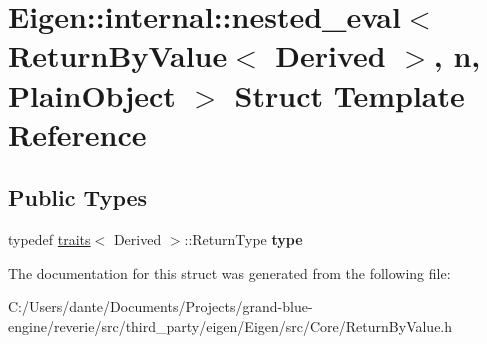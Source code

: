 \hypertarget{struct_eigen_1_1internal_1_1nested__eval_3_01_return_by_value_3_01_derived_01_4_00_01n_00_01_plain_object_01_4}{}\section{Eigen\+::internal\+::nested\+\_\+eval$<$ Return\+By\+Value$<$ Derived $>$, n, Plain\+Object $>$ Struct Template Reference}
\label{struct_eigen_1_1internal_1_1nested__eval_3_01_return_by_value_3_01_derived_01_4_00_01n_00_01_plain_object_01_4}
\subsection*{Public Types}
\begin{DoxyCompactItemize}
\item 
\mbox{\label{struct_eigen_1_1internal_1_1nested__eval_3_01_return_by_value_3_01_derived_01_4_00_01n_00_01_plain_object_01_4_a2548d47a8e27255de008b64a904a9046}} 
typedef \mbox{\hyperlink{struct_eigen_1_1internal_1_1traits}{traits}}$<$ Derived $>$\+::Return\+Type {\bfseries type}
\end{DoxyCompactItemize}


The documentation for this struct was generated from the following file\+:\begin{DoxyCompactItemize}
\item 
C\+:/\+Users/dante/\+Documents/\+Projects/grand-\/blue-\/engine/reverie/src/third\+\_\+party/eigen/\+Eigen/src/\+Core/Return\+By\+Value.\+h\end{DoxyCompactItemize}
